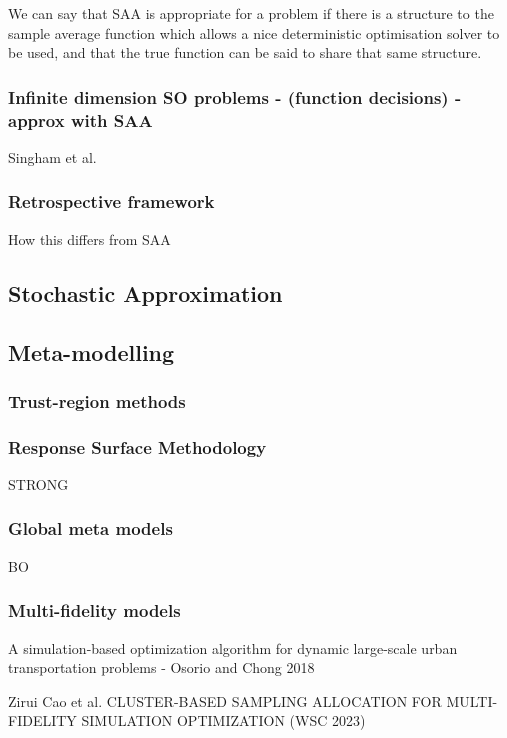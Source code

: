 \documentclass{article}
\begin{document}
We can say that SAA is appropriate for a problem if there is a structure to the sample average function which allows a nice deterministic optimisation solver to be used, and that the true function can be said to share that same structure.

\subsubsection{Infinite dimension SO problems - (function decisions) - approx with SAA}

Singham et al. 

\subsubsection{Retrospective framework}

How this differs from SAA

\subsection{Stochastic Approximation}

\subsection{Meta-modelling}

\subsubsection{Trust-region methods}

\subsubsection{Response Surface Methodology}

STRONG

\subsubsection{Global meta models}

BO

\subsubsection{Multi-fidelity models}

A simulation-based optimization algorithm for dynamic large-scale urban transportation problems - Osorio and Chong 2018 \newline

Zirui Cao et al. CLUSTER-BASED SAMPLING ALLOCATION FOR MULTI-FIDELITY SIMULATION OPTIMIZATION (WSC 2023)
\end{document}
